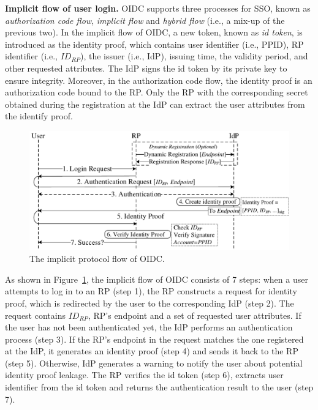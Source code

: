 \noindent\textbf{Implicit flow of user login.}
OIDC supports three processes for SSO, known as {\em authorization code flow}, {\em implicit flow} and {\em hybrid flow} (i.e., a mix-up of the previous two).
In the implicit flow of OIDC, a new token, known as {\em id token}, is introduced as the identity proof, which contains user identifier (i.e., PPID), RP identifier (i.e., $ID_{RP}$), the issuer (i.e., IdP), issuing time, the validity period, and other requested attributes. The IdP signs the id token by its private key to ensure integrity.
Moreover, in the authorization code flow, the identity proof is an authorization code bound to the RP. Only the RP with the corresponding secret obtained during the registration at the IdP can extract the user attributes from the identify proof.



\begin{figure}[t]
  \centering
  \includegraphics[width=\linewidth]{fig/OIDC1.pdf}
  \caption{The implicit protocol flow of OIDC.}
  \label{fig:OpenID}
\end{figure}

As shown in Figure~\ref{fig:OpenID}, the implicit flow of OIDC consists of 7 steps: when a user attempts to log in to an RP (step 1), the RP constructs a request for identity proof, which is redirected by the user to the corresponding IdP (step 2). The request contains $ID_{RP}$, RP's endpoint and a set of requested user attributes. If the user has not been authenticated yet, the IdP performs an authentication process (step 3). If the RP's endpoint in the request matches the one registered at the IdP, it generates an identity proof (step 4) and sends it back to the RP (step 5). Otherwise, IdP generates a warning to notify the user about potential identity proof leakage. The RP verifies the id token (step 6), extracts user identifier from the id token and returns the authentication result to the user (step 7).



